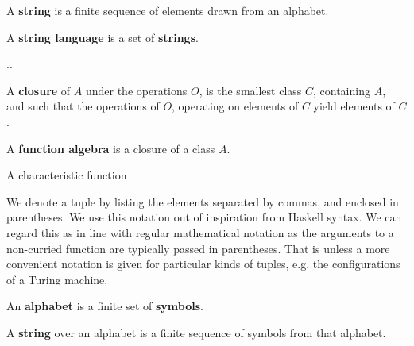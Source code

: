 \begin{definition}

A \textbf{string} is a finite sequence of elements drawn from an alphabet.

\end{definition}

\begin{definition}

A \textbf{string language} is a set of \textbf{strings}.

\end{definition}

..

\begin{definition}

A \textbf{closure} of $A$ under the operations $O$, is the smallest class $C$,
containing $A$, and such that the operations of $O$, operating on elements of
$C$ yield elements of $C$.

\end{definition}

\begin{definition}

A \textbf{function algebra} is a closure of a class $A$.

\end{definition}

\begin{definition}

A characteristic function 

\end{definition}

\begin{notation} We denote a tuple by listing the elements separated by commas,
and enclosed in parentheses. We use this notation out of inspiration from
Haskell syntax. We can regard this as in line with regular mathematical
notation as the arguments to a non-curried function are typically passed in
parentheses. That is unless a more convenient notation is given for particular
kinds of tuples, e.g. the configurations of a Turing machine.\end{notation}

\begin{definition} An \textbf{alphabet} is a finite set of \textbf{symbols}.
\end{definition}

\begin{definition} A \textbf{string} over an alphabet is a finite sequence of
symbols from that alphabet. \end{definition}


